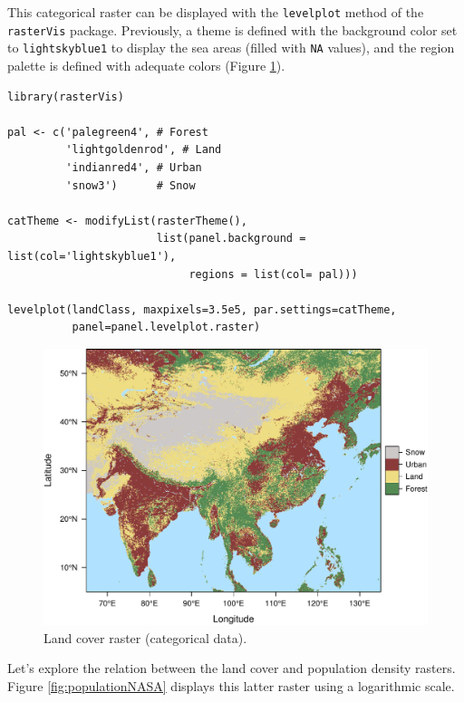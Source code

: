 \documentclass[smallroyalvopaper]{memoir}
\begin{document}
This categorical raster can be displayed with the \texttt{levelplot} method
of the \texttt{rasterVis} package. Previously, a theme is defined with the
background color set to \texttt{lightskyblue1} to display the sea areas
(filled with \texttt{NA} values), and the region palette is defined with
adequate colors (Figure \ref{fig:landClass}).


\lstset{language=R,numbers=none}
\begin{lstlisting}
library(rasterVis)

pal <- c('palegreen4', # Forest
         'lightgoldenrod', # Land
         'indianred4', # Urban
         'snow3')      # Snow

catTheme <- modifyList(rasterTheme(),
                       list(panel.background = list(col='lightskyblue1'),
                            regions = list(col= pal)))

levelplot(landClass, maxpixels=3.5e5, par.settings=catTheme,
          panel=panel.levelplot.raster)
\end{lstlisting}

\begin{figure}[htb]
\centering
\includegraphics[width=.9\linewidth]{figs/landClass.pdf}
\caption{\label{fig:landClass}Land cover raster (categorical data).}
\end{figure}

Let's explore the relation between the land cover and population
density rasters. Figure \ref{fig:populationNASA} displays this
latter raster using a logarithmic scale.
\end{document}
